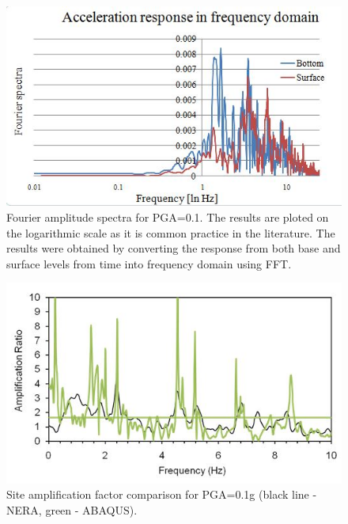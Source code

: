 	
	\begin{figure}[!h]
		\centering
		\includegraphics[width=0.6\linewidth]{"spectral_low"}
		\caption{Fourier amplitude spectra for PGA=0.1. The results are ploted on the logarithmic scale as it is common practice in the literature. The results were obtained by converting the response from both base and surface levels from time into frequency domain using FFT.}
		\label{fourier3}
	\end{figure}
	
	\begin{figure}[!h]
		\centering
		\includegraphics[width=0.6\linewidth]{"site_ampl"}
		\caption{Site amplification factor comparison for PGA=0.1g (black line - NERA, green - ABAQUS).}
		\label{SAF}
	\end{figure}
	
